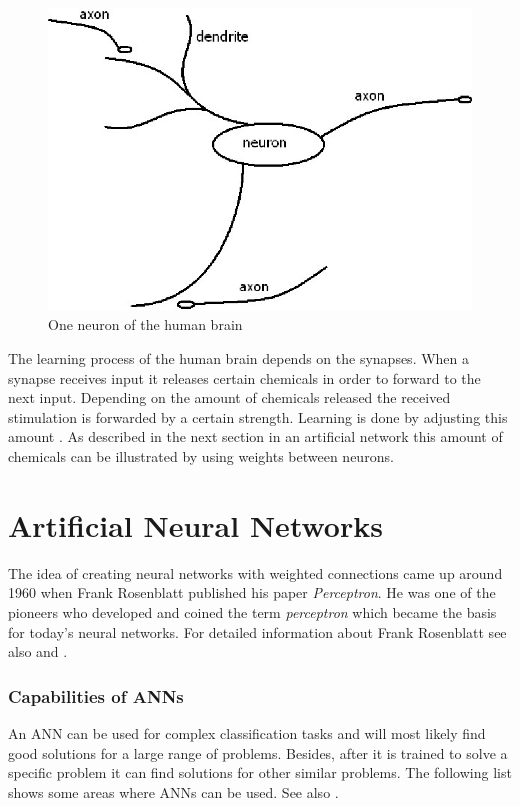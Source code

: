 \begin{figure}
	\begin{center}
		\includegraphics[width=0.75\columnwidth]{graphics/HumanNeuron}
	\end{center}
	\vspace{-1em}
	\caption{One neuron of the human brain}
	\vspace{1em}
	\label{singleneuron}
\end{figure}

The learning process of the human brain depends on the synapses. When a synapse receives input it releases certain chemicals in order to forward to the next input. Depending on the amount of chemicals released the received stimulation is forwarded by a certain strength. Learning is done by adjusting this amount \cite[p.157]{essence}. As described in the next section in an artificial network this amount of chemicals can be illustrated by using weights between neurons.

\section{Artificial Neural Networks}

The idea of creating neural networks with weighted connections came up around 1960 when Frank Rosenblatt published his paper {\em Perceptron}. He was one of the pioneers who developed and coined the term {\em perceptron} which became the basis for today's neural networks. For detailed information about Frank Rosenblatt see also \cite{rosenblatt} and \cite[p.55]{neuralnetworks}.

\subsubsection{Capabilities of ANNs}

An ANN can be used for complex classification tasks and will most likely find good solutions for a large range of problems. Besides, after it is trained to solve a specific problem it can find solutions for other similar problems. The following list shows some areas where ANNs can be used. See also \cite{nn_applications}.

